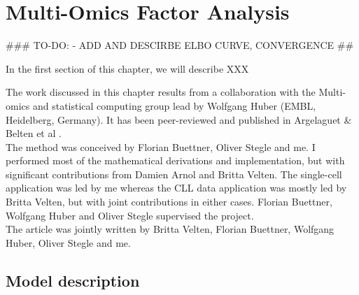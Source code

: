 \section{Multi-Omics Factor Analysis}

###
TO-DO:
- ADD AND DESCIRBE ELBO CURVE, CONVERGENCE		
##


In the first section of this chapter, we will describe XXX

The work discussed in this chapter results from a collaboration with the Multi-omics and statistical computing group lead by Wolfgang Huber (EMBL, Heidelberg, Germany). It has been peer-reviewed and published in Argelaguet \& Belten et al \cite{Clark2018}.\\

The method was conceived by Florian Buettner, Oliver Stegle and me. I performed most of the mathematical derivations and implementation, but with significant contributions from Damien Arnol and Britta Velten. The single-cell application was led by me whereas the CLL data application was mostly led by Britta Velten, but with joint contributions in either cases. Florian Buettner, Wolfgang Huber and Oliver Stegle supervised the project.\\
The article was jointly written by Britta Velten, Florian Buettner, Wolfgang Huber, Oliver Stegle and me.


\subsection{Model description}

